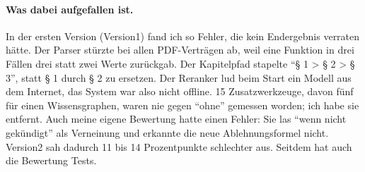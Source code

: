 \paragraph{Was dabei aufgefallen ist.} In der ersten Version (Version1) fand ich so Fehler, die kein Endergebnis verraten hätte. Der Parser stürzte bei allen PDF-Verträgen ab, weil eine Funktion in drei Fällen drei statt zwei Werte zurückgab. Der Kapitelpfad stapelte \enquote{§ 1 > § 2 > § 3}, statt § 1 durch § 2 zu ersetzen. Der Reranker lud beim Start ein Modell aus dem Internet, das System war also nicht offline. 15 Zusatzwerkzeuge, davon fünf für einen Wissensgraphen, waren nie gegen \enquote{ohne} gemessen worden; ich habe sie entfernt. Auch meine eigene Bewertung hatte einen Fehler: Sie las \enquote{wenn nicht gekündigt} als Verneinung und erkannte die neue Ablehnungsformel nicht. Version2 sah dadurch 11 bis 14 Prozentpunkte schlechter aus. Seitdem hat auch die Bewertung Tests.
